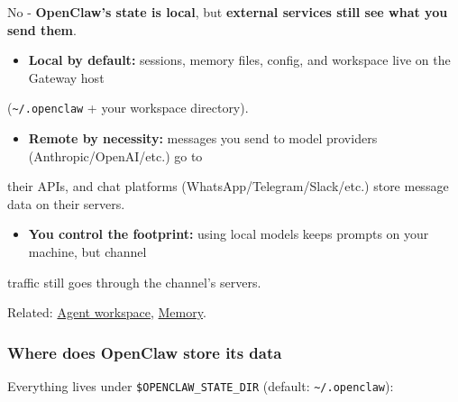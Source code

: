 No - \textbf{OpenClaw's state is local}, but \textbf{external services still see what you send them}.

\begin{itemize}
  \item \textbf{Local by default:} sessions, memory files, config, and workspace live on the Gateway host
\end{itemize}

(\texttt{\textasciitilde{}/.openclaw} + your workspace directory).
\begin{itemize}
  \item \textbf{Remote by necessity:} messages you send to model providers (Anthropic/OpenAI/etc.) go to
\end{itemize}

their APIs, and chat platforms (WhatsApp/Telegram/Slack/etc.) store message data on their
servers.
\begin{itemize}
  \item \textbf{You control the footprint:} using local models keeps prompts on your machine, but channel
\end{itemize}

traffic still goes through the channel's servers.

Related: \href{/concepts/agent-workspace}{Agent workspace}, \href{/concepts/memory}{Memory}.

\subsubsection{Where does OpenClaw store its data}


Everything lives under \texttt{\$OPENCLAW\_STATE\_DIR} (default: \texttt{\textasciitilde{}/.openclaw}):


